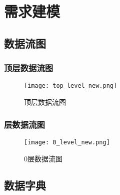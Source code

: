 \chapter{\color{red} 需求建模}
\begin{landscape}
    \section{\color{red} 数据流图}
    
        \subsection{\color{red} 顶层数据流图}
    
        \begin{figure}[ht]
            \centering
            \texttt{[image: top\_level\_new.png]}\label{tab:classification}
            \caption{\color{red} 顶层数据流图}\label{fig:noted-figure}
        \end{figure}
    \end{landscape}
        \newpage
    \begin{landscape}
        \subsection{\color{red} 层数据流图}
        \begin{figure}[ht]
            \centering
            \texttt{[image: 0\_level\_new.png]}\label{tab:classification}
            \caption{\color{red} 0层数据流图}\label{fig:noted-figure}
        \end{figure}
    \end{landscape}
        \newpage
    \section{\color{red} 数据字典}

